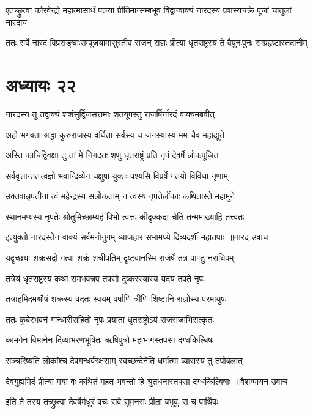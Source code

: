 \twolineshloka
{एतच्छ्रुत्वा कौरवेन्द्रो महात्मासार्धं पत्न्या प्रीतिमान्सम्बभूव}
{विद्वान्वाक्यं नारदस्य प्रशस्यचक्रे पूजां चातुलां नारदाय}


\twolineshloka
{ततः सर्वे नारदं विप्रसङ्घाःसम्पूजयामासुरतीव राजन्}
{राज्ञः प्रीत्या धृतराष्ट्रस्य ते वैपुनःपुनः सम्प्रहृष्टास्तदानीम्}


\chapter{अध्यायः २२}
\twolineshloka
{नारदस्य तु तद्वाक्यं शशंसुर्द्विजसत्तमाः}
{शतयूपस्तु राजर्षिर्नारदं वाक्यमब्रवीत्}


\twolineshloka
{अहो भगवता श्रद्धा कुरुराजस्य वर्धिता}
{सर्वस्य च जनस्यास्य मम चैव महाद्युते}


\twolineshloka
{अस्ति काचिद्विवक्षा तु तां मे निगदतः शृणु}
{धृतराष्ट्रं प्रति नृपं देवर्षे लोकपूजित}


\twolineshloka
{सर्ववृत्तान्ततत्त्वज्ञो भवान्दिव्येन चक्षुषा}
{युक्तः पश्यसि विप्रर्षे गतयो विविधा नृणाम्}


\twolineshloka
{उक्तवान्नृपतीनां त्वं महेन्द्रस्य सलोकताम्}
{न त्वस्य नृपतेर्लोकाः कथितास्ते महामुने}


\twolineshloka
{स्थानमप्यस्य नृपतेः श्रोतुमिच्छाम्यहं विभो}
{त्वत्तः कीदृक्कदा चेति तन्ममाख्याहि तत्त्वतः}


\threelineshloka
{इत्युक्तो नारदस्तेन वाक्यं सर्वमनोनुगम्}
{व्याजहार सभामध्ये दिव्यदर्शी महातपाः ॥नारद उवाच}
{}


\twolineshloka
{यदृच्छया शक्रसदो गत्वा शक्रं शचीपतिम्}
{दृष्टवानस्मि राजर्षे तत्र पाण्डुं नराधिपम्}


\twolineshloka
{तत्रेयं धृतराष्ट्रस्य कथा समभवन्नप}
{तपसो दुष्करस्यास्य यदयं तपते नृपः}


\twolineshloka
{तत्राहमिदमश्रौषं शक्रस्य वदतः स्वयम्}
{वर्षाणि त्रीणि शिष्टानि राज्ञोस्य परमायुषः}


\twolineshloka
{ततः कुबेरभवनं गान्धारीसहितो नृपः}
{प्रयाता धृतराष्ट्रोऽयं राजराजाभिसत्कृतः}


\twolineshloka
{कामगेन विमानेन दिव्याभरणभूषितः}
{ऋषिपुत्रो महाभागस्तपसा दग्धकिल्बिषः}


\twolineshloka
{सञ्चरिष्यति लोकांश्च देवगन्धर्वरक्षसाम्}
{स्वच्छन्देनेति धर्मात्मा व्यासस्य तु तपोबलात्}


\threelineshloka
{देवगुह्यमिदं प्रीत्या मया वः कथितं महत्}
{भवन्तो हि श्रुतधनास्तपसा दग्धकिल्बिषाः ॥वैशम्पायन उवाच}
{}


\twolineshloka
{इति ते तस्य तच्छ्रुत्वा देवर्षेर्मधुरं वचः}
{सर्वे सुमनसः प्रीता बभूवुः स च पार्थिवः}


